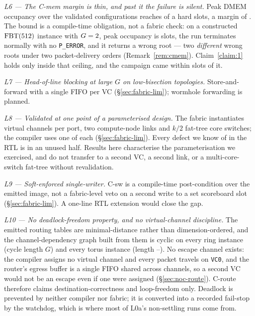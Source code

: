 \documentclass[journal,10pt]{IEEEtran}
\theoremstyle{plain}
\theoremstyle{definition}
\theoremstyle{remark}
\newcommand{\FBT}{\ensuremath{\mathrm{FBT}}}
\newcommand{\sv}[1]{\texttt{#1}}
\begin{document}
\emph{L6 --- The \textsf{C-mem} margin is thin, and past it the failure is
silent.} Peak DMEM occupancy over the validated configurations reaches
\DmemPeakMax{} of a hard \DmemDepth{} slots, a margin of \DmemMargin{}. The
bound is a compile-time obligation, not a fabric check: on a constructed
$\FBT(\DmemCexLeaves)$ instance with $G=2$, peak occupancy is
\DmemCexPeak{} slots, the run terminates normally with no \texttt{P\_ERROR},
and it returns a wrong root --- two \emph{different} wrong roots under two
packet-delivery orders (Remark~\ref{rem:cmem}). Claim~\ref{claim:1} holds only
inside that ceiling, and the campaign came within \DmemMargin{} slots of it.

\emph{L7 --- Head-of-line blocking at large $G$ on low-bisection topologies.}
Store-and-forward with a single FIFO per VC (\S\ref{sec:fabric-lim}); wormhole
forwarding is planned.

\emph{L8 --- Validated at one point of a parameterised design.} The fabric
instantiates \NumVcs{} virtual channels per port, two compute-node links and
$k/2$ fat-tree core switches; the compiler uses one of each
(\S\ref{sec:fabric-lim}). Every defect we know of in the RTL is in an unused
half. Results here characterise the parameterisation we exercised, and do not
transfer to a second VC, a second link, or a multi-core-switch fat-tree
without revalidation.

\emph{L9 --- Soft-enforced single-writer.} \textsf{C-sw} is a compile-time
post-condition over the emitted image, not a fabric-level veto on a second
write to a set scoreboard slot (\S\ref{sec:fabric-lim}). A one-line RTL
extension would close the gap.

\emph{L10 --- No deadlock-freedom property, and no virtual-channel
discipline.} The emitted routing tables are minimal-distance rather than
dimension-ordered, and the channel-dependency graph built from them is cyclic
on every ring instance (cycle length $G$) and every torus instance (length
\CdgTorusCycLo--\CdgTorusCycHi). No escape channel exists: the compiler
assigns no virtual channel and every packet travels on \sv{VC0}, and the
router's egress buffer is a single FIFO shared across channels, so a second VC
would not be an escape even if one were assigned (\S\ref{sec:noc-route}).
\textsf{C-route} therefore claims destination-correctness and loop-freedom
only. Deadlock is prevented by neither compiler nor fabric; it is converted
into a recorded fail-stop by the watchdog, which is where most of L0a's
non-settling runs come from.
\end{document}
